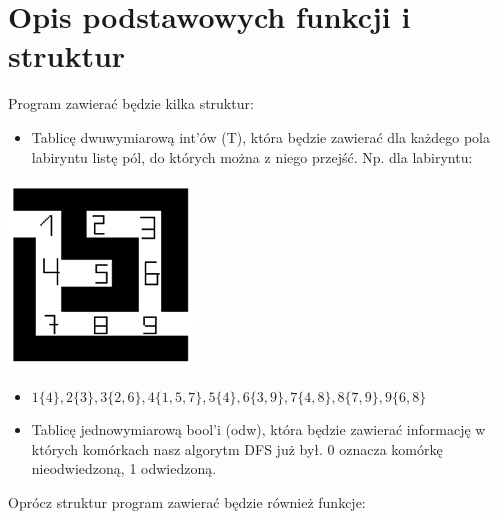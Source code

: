 \documentclass{article}
\begin{document}
\section{Opis podstawowych funkcji i struktur}

Program zawierać będzie kilka struktur:
\begin{itemize}
\item Tablicę dwuwymiarową int’ów (T), która będzie zawierać dla każdego pola labiryntu listę pól, do których można z niego przejść. Np. dla labiryntu:
\end{itemize}

    \centering
    \includegraphics[width=0.3\linewidth]{image.png}


\begin{itemize}
Tablica będzie wyglądać:\newline

\item $1\{4\}, 2\{3\}, 3\{2,6\}, 4\{1,5,7\}, 5\{4\}, 6\{3,9\}, 7\{4,8\}, 8\{7,9\}, 9\{6,8\}$
\end{itemize}
\begin{itemize}
\item Tablicę jednowymiarową bool’i (odw), która będzie zawierać informację w których komórkach nasz algorytm DFS już był. 0 oznacza komórkę nieodwiedzoną, 1 odwiedzoną.
\end{itemize}

\begin{flashleft}
Oprócz struktur program zawierać będzie również funkcje:
\end{flashleft}
\end{document}
